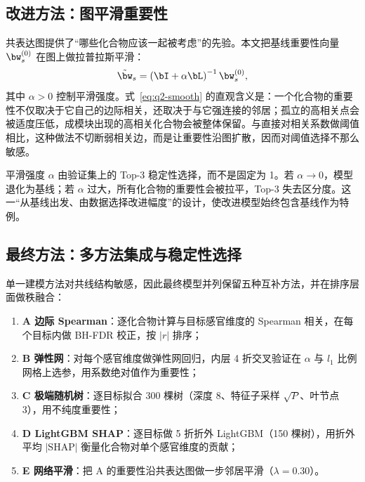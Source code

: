 \subsection{改进方法：图平滑重要性}

共表达图提供了“哪些化合物应该一起被考虑”的先验。本文把基线重要性向量 $\bw_s^{(0)}$ 在图上做拉普拉斯平滑：
\begin{equation}
  \tilde{\bw}_s=\left(\bI+\alpha\bL\right)^{-1}\bw_s^{(0)},
  \label{eq:q2-smooth}
\end{equation}
其中 $\alpha>0$ 控制平滑强度。式~\eqref{eq:q2-smooth} 的直观含义是：一个化合物的重要性不仅取决于它自己的边际相关，还取决于与它强连接的邻居；孤立的高相关点会被适度压低，成模块出现的高相关化合物会被整体保留。与直接对相关系数做阈值相比，这种做法不切断弱相关边，而是让重要性沿图扩散，因而对阈值选择不那么敏感。

平滑强度 $\alpha$ 由验证集上的 Top-3 稳定性选择，而不是固定为 1。若 $\alpha\to 0$，模型退化为基线；若 $\alpha$ 过大，所有化合物的重要性会被拉平，Top-3 失去区分度。这一“从基线出发、由数据选择改进幅度”的设计，使改进模型始终包含基线作为特例。

\subsection{最终方法：多方法集成与稳定性选择}

单一建模方法对共线结构敏感，因此最终模型并列保留五种互补方法，并在排序层面做秩融合：

\begin{enumerate}
  \item \textbf{A 边际 Spearman}：逐化合物计算与目标感官维度的 Spearman 相关，在每个目标内做 BH-FDR 校正，按 $|r|$ 排序；
  \item \textbf{B 弹性网}：对每个感官维度做弹性网回归，内层 4 折交叉验证在 $\alpha$ 与 $l_1$ 比例网格上选参，用系数绝对值作为重要性\citep{zou2005regularization}；
  \item \textbf{C 极端随机树}：逐目标拟合 300 棵树（深度 8、特征子采样 $\sqrt{P}$、叶节点 3），用不纯度重要性\citep{breiman2001random}；
  \item \textbf{D LightGBM SHAP}：逐目标做 5 折折外 LightGBM（150 棵树），用折外平均 $|\mathrm{SHAP}|$ 衡量化合物对单个感官维度的贡献\citep{friedman2001greedy,chen2016xgboost,lundberg2017unified}；
  \item \textbf{E 网络平滑}：把 A 的重要性沿共表达图做一步邻居平滑（$\lambda=0.30$）。
\end{enumerate}

